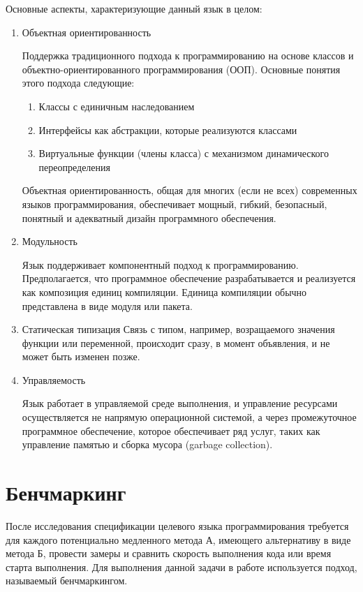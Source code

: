 \documentclass{mipt-thesis-bs}
\begin{document}
Основные аспекты, характеризующие данный язык в целом:

\begin{enumerate}
    \item Объектная ориентированность

    Поддержка традиционного подхода к программированию на основе классов и
    объектно-ориентированного программирования (ООП). Основные понятия этого подхода следующие:
    \begin{enumerate}
        \item Классы с единичным наследованием
        \item Интерфейсы как абстракции, которые реализуются классами
        \item Виртуальные функции (члены класса) с механизмом динамического переопределения
    \end{enumerate}
    Объектная ориентированность, общая для многих (если не всех) современных языков программирования,
    обеспечивает мощный, гибкий, безопасный, понятный и адекватный дизайн программного обеспечения.

    \item Модульность

    Язык поддерживает компонентный подход к программированию. Предполагается, что
    программное обеспечение разрабатывается и реализуется как композиция единиц
     компиляции. Единица компиляции обычно представлена в виде модуля или пакета.

    \item Статическая типизация
    Связь с типом, например, возращаемого значения функции или переменной, происходит сразу, в момент объявления,
    и не может быть изменен позже.

    \item Управляемость

    Язык работает в управляемой среде выполнения, и управление ресурсами осуществляется не напрямую
    операционной системой, а через промежуточное программное обеспечение, которое обеспечивает ряд услуг,
    таких как управление памятью и сборка мусора (garbage collection).
\end{enumerate}
\section{Бенчмаркинг}

После исследования спецификации целевого языка программирования требуется для каждого
потенциально медленного метода А, имеющего альтернативу в виде метода Б, провести
замеры и сравнить скорость выполнения кода или время старта выполнения. Для выполнения
данной задачи в работе используется подход, называемый бенчмаркингом.
\end{document}
